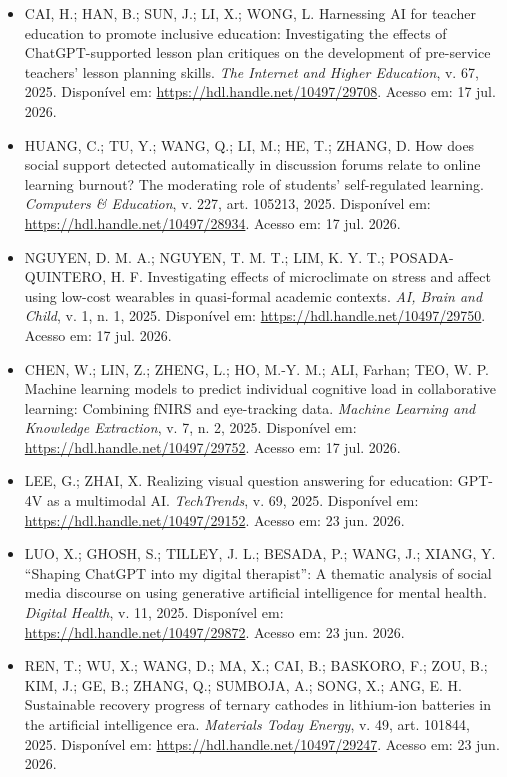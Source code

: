 \documentclass[english]{textolivre}
\begin{document}
\begin{itemize}
\item[] CAI, H.; HAN, B.; SUN, J.; LI, X.; WONG, L. Harnessing AI for teacher education to promote inclusive education: Investigating the effects of ChatGPT-supported lesson plan critiques on the development of pre-service teachers' lesson planning skills. \textit{The Internet and Higher Education}, v. 67, 2025. Disponível em: \url{https://hdl.handle.net/10497/29708}. Acesso em: 17 jul. 2026.

\item[] HUANG, C.; TU, Y.; WANG, Q.; LI, M.; HE, T.; ZHANG, D. How does social support detected automatically in discussion forums relate to online learning burnout? The moderating role of students' self-regulated learning. \textit{Computers \& Education}, v. 227, art. 105213, 2025. Disponível em: \url{https://hdl.handle.net/10497/28934}. Acesso em: 17 jul. 2026.

\item[] NGUYEN, D. M. A.; NGUYEN, T. M. T.; LIM, K. Y. T.; POSADA-QUINTERO, H. F. Investigating effects of microclimate on stress and affect using low-cost wearables in quasi-formal academic contexts. \textit{AI, Brain and Child}, v. 1, n. 1, 2025. Disponível em: \url{https://hdl.handle.net/10497/29750}. Acesso em: 17 jul. 2026.

\item[] CHEN, W.; LIN, Z.; ZHENG, L.; HO, M.-Y. M.; ALI, Farhan; TEO, W. P. Machine learning models to predict individual cognitive load in collaborative learning: Combining fNIRS and eye-tracking data. \textit{Machine Learning and Knowledge Extraction}, v. 7, n. 2, 2025. Disponível em: \url{https://hdl.handle.net/10497/29752}. Acesso em: 17 jul. 2026.

\item[] LEE, G.; ZHAI, X. Realizing visual question answering for education: GPT-4V as a multimodal AI. \textit{TechTrends}, v. 69, 2025. Disponível em: \url{https://hdl.handle.net/10497/29152}. Acesso em: 23 jun. 2026.

\item[] LUO, X.; GHOSH, S.; TILLEY, J. L.; BESADA, P.; WANG, J.; XIANG, Y. “Shaping ChatGPT into my digital therapist”: A thematic analysis of social media discourse on using generative artificial intelligence for mental health. \textit{Digital Health}, v. 11, 2025. Disponível em: \url{https://hdl.handle.net/10497/29872}. Acesso em: 23 jun. 2026.

\item[] REN, T.; WU, X.; WANG, D.; MA, X.; CAI, B.; BASKORO, F.; ZOU, B.; KIM, J.; GE, B.; ZHANG, Q.; SUMBOJA, A.; SONG, X.; ANG, E. H. Sustainable recovery progress of ternary cathodes in lithium-ion batteries in the artificial intelligence era. \textit{Materials Today Energy}, v. 49, art. 101844, 2025. Disponível em: \url{https://hdl.handle.net/10497/29247}. Acesso em: 23 jun. 2026.


\end{itemize}
\end{document}
